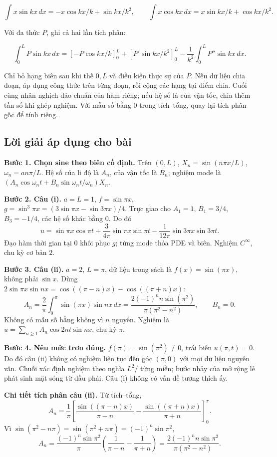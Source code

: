 \documentclass[10pt,a4paper]{article}
\begin{document}
\[
\int x\sin kx\,dx=-x\cos kx/k+\sin kx/k^2,\qquad
\int x\cos kx\,dx=x\sin kx/k+\cos kx/k^2.
\]


Với đa thức $P$, ghi cả hai lần tích phân:


\[
\int_0^L P\sin kx\,dx
=\left[-P\cos kx/k\right]_0^L+
\left[P'\sin kx/k^2\right]_0^L-
\frac1{k^2}\int_0^L P''\sin kx\,dx.
\]


Chỉ bỏ hạng biên sau khi thế $0,L$ và điều kiện thực sự của $P$. Nếu dữ liệu chia đoạn, áp dụng công thức trên từng đoạn, rồi cộng các hạng tại điểm chia. Cuối cùng nhân nghịch đảo chuẩn của hàm riêng; nếu hệ số là của vận tốc, chia thêm tần số khi ghép nghiệm. Với mẫu số bằng $0$ trong tích–tổng, quay lại tích phân gốc để tính riêng.
\subsection*{Lời giải áp dụng cho bài}
\textbf{Bước 1. Chọn sine theo biên cố định.} Trên $(0,L)$, $X_n=\sin(n\pi x/L)$, $\omega_n=an\pi/L$. Hệ số của li độ là $A_n$, của vận tốc là $B_n$; nghiệm mode là $(A_n\cos\omega_nt+B_n\sin\omega_nt/\omega_n)X_n$.

\textbf{Bước 2. Câu (i).} $a=L=1$, $f=\sin\pi x$, $g=\sin^3\pi x=(3\sin\pi x-\sin3\pi x)/4$. Trực giao cho $A_1=1$, $B_1=3/4$, $B_3=-1/4$, các hệ số khác bằng $0$. Do đó
\[u=\sin\pi x\cos\pi t+\frac3{4\pi}\sin\pi x\sin\pi t-\frac1{12\pi}\sin3\pi x\sin3\pi t.\]
Đạo hàm thời gian tại $0$ khôi phục $g$; từng mode thỏa PDE và biên. Nghiệm $C^\infty$, chu kỳ cơ bản $2$.

\textbf{Bước 3. Câu (ii).} $a=2$, $L=\pi$, dữ liệu trong sách là $f(x)=\sin(\pi x)$, không phải $\sin x$. Dùng $2\sin\pi x\sin nx=\cos((\pi-n)x)-\cos((\pi+n)x)$:
\[A_n=\frac2\pi\int_0^\pi\sin(\pi x)\sin nx\,dx
=\frac{2(-1)^nn\sin(\pi^2)}{\pi(\pi^2-n^2)},\qquad B_n=0.\]
Không có mẫu số bằng không vì $n$ nguyên. Nghiệm là $u=\sum_{n\ge1}A_n\cos2nt\sin nx$, chu kỳ $\pi$.

\textbf{Bước 4. Nêu mức trơn đúng.} $f(\pi)=\sin(\pi^2)\ne0$, trái biên $u(\pi,t)=0$. Do đó câu (ii) không có nghiệm liên tục đến góc $(\pi,0)$ với mọi dữ liệu nguyên văn. Chuỗi xác định nghiệm theo nghĩa $L^2$/ từng miền; bước nhảy của mở rộng lẻ phát sinh mặt sóng từ đầu phải. Câu (i) không có vấn đề tương thích ấy.

\textbf{Chi tiết tích phân câu (ii).} Từ tích–tổng,
\[A_n=\frac1\pi\left[\frac{\sin((\pi-n)x)}{\pi-n}-\frac{\sin((\pi+n)x)}{\pi+n}\right]_0^\pi.\]
Vì $\sin(\pi^2-n\pi)=\sin(\pi^2+n\pi)=(-1)^n\sin\pi^2$,
\[A_n=\frac{(-1)^n\sin\pi^2}{\pi}\left(\frac1{\pi-n}-\frac1{\pi+n}\right)
=\frac{2(-1)^nn\sin\pi^2}{\pi(\pi^2-n^2)}.\]
\end{document}
